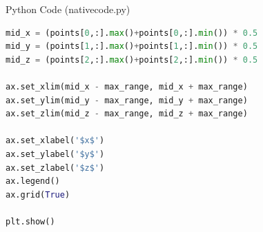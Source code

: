 \documentclass{beamer}
\begin{document}
\begin{frame}[fragile]{Python Code (nativecode.py)}
\begin{lstlisting}[language=Python]
mid_x = (points[0,:].max()+points[0,:].min()) * 0.5
mid_y = (points[1,:].max()+points[1,:].min()) * 0.5
mid_z = (points[2,:].max()+points[2,:].min()) * 0.5

ax.set_xlim(mid_x - max_range, mid_x + max_range)
ax.set_ylim(mid_y - max_range, mid_y + max_range)
ax.set_zlim(mid_z - max_range, mid_z + max_range)

ax.set_xlabel('$x$')
ax.set_ylabel('$y$')
ax.set_zlabel('$z$')
ax.legend()
ax.grid(True)

plt.show()
\end{lstlisting}
\end{frame}
\end{document}
